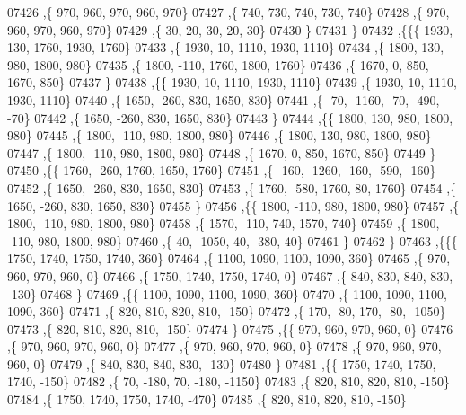 \begin{DoxyCode}
07426     ,\{   970,   960,   970,   960,   970\}
07427     ,\{   740,   730,   740,   730,   740\}
07428     ,\{   970,   960,   970,   960,   970\}
07429     ,\{    30,    20,    30,    20,    30\}
07430     \}
07431    \}
07432   ,\{\{\{  1930,   130,  1760,  1930,  1760\}
07433     ,\{  1930,    10,  1110,  1930,  1110\}
07434     ,\{  1800,   130,   980,  1800,   980\}
07435     ,\{  1800,  -110,  1760,  1800,  1760\}
07436     ,\{  1670,     0,   850,  1670,   850\}
07437     \}
07438    ,\{\{  1930,    10,  1110,  1930,  1110\}
07439     ,\{  1930,    10,  1110,  1930,  1110\}
07440     ,\{  1650,  -260,   830,  1650,   830\}
07441     ,\{   -70, -1160,   -70,  -490,   -70\}
07442     ,\{  1650,  -260,   830,  1650,   830\}
07443     \}
07444    ,\{\{  1800,   130,   980,  1800,   980\}
07445     ,\{  1800,  -110,   980,  1800,   980\}
07446     ,\{  1800,   130,   980,  1800,   980\}
07447     ,\{  1800,  -110,   980,  1800,   980\}
07448     ,\{  1670,     0,   850,  1670,   850\}
07449     \}
07450    ,\{\{  1760,  -260,  1760,  1650,  1760\}
07451     ,\{  -160, -1260,  -160,  -590,  -160\}
07452     ,\{  1650,  -260,   830,  1650,   830\}
07453     ,\{  1760,  -580,  1760,    80,  1760\}
07454     ,\{  1650,  -260,   830,  1650,   830\}
07455     \}
07456    ,\{\{  1800,  -110,   980,  1800,   980\}
07457     ,\{  1800,  -110,   980,  1800,   980\}
07458     ,\{  1570,  -110,   740,  1570,   740\}
07459     ,\{  1800,  -110,   980,  1800,   980\}
07460     ,\{    40, -1050,    40,  -380,    40\}
07461     \}
07462    \}
07463   ,\{\{\{  1750,  1740,  1750,  1740,   360\}
07464     ,\{  1100,  1090,  1100,  1090,   360\}
07465     ,\{   970,   960,   970,   960,     0\}
07466     ,\{  1750,  1740,  1750,  1740,     0\}
07467     ,\{   840,   830,   840,   830,  -130\}
07468     \}
07469    ,\{\{  1100,  1090,  1100,  1090,   360\}
07470     ,\{  1100,  1090,  1100,  1090,   360\}
07471     ,\{   820,   810,   820,   810,  -150\}
07472     ,\{   170,   -80,   170,   -80, -1050\}
07473     ,\{   820,   810,   820,   810,  -150\}
07474     \}
07475    ,\{\{   970,   960,   970,   960,     0\}
07476     ,\{   970,   960,   970,   960,     0\}
07477     ,\{   970,   960,   970,   960,     0\}
07478     ,\{   970,   960,   970,   960,     0\}
07479     ,\{   840,   830,   840,   830,  -130\}
07480     \}
07481    ,\{\{  1750,  1740,  1750,  1740,  -150\}
07482     ,\{    70,  -180,    70,  -180, -1150\}
07483     ,\{   820,   810,   820,   810,  -150\}
07484     ,\{  1750,  1740,  1750,  1740,  -470\}
07485     ,\{   820,   810,   820,   810,  -150\}

\end{DoxyCode}
